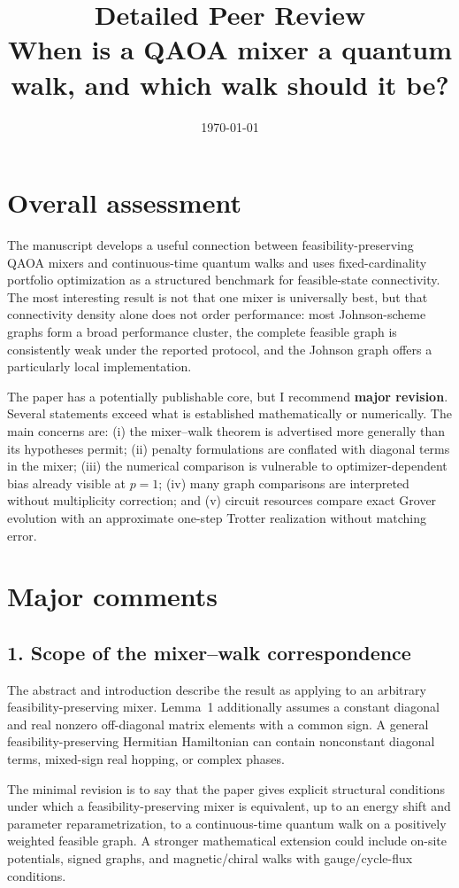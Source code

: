 \documentclass[11pt]{article}
\title{Detailed Peer Review\\\large When is a QAOA mixer a quantum walk, and which walk should it be?}
\date{\today}
\begin{document}
\maketitle
\section*{Overall assessment}
The manuscript develops a useful connection between feasibility-preserving QAOA mixers and continuous-time quantum walks and uses fixed-cardinality portfolio optimization as a structured benchmark for feasible-state connectivity. The most interesting result is not that one mixer is universally best, but that connectivity density alone does not order performance: most Johnson-scheme graphs form a broad performance cluster, the complete feasible graph is consistently weak under the reported protocol, and the Johnson graph offers a particularly local implementation.

The paper has a potentially publishable core, but I recommend \textbf{major revision}. Several statements exceed what is established mathematically or numerically. The main concerns are: (i) the mixer--walk theorem is advertised more generally than its hypotheses permit; (ii) penalty formulations are conflated with diagonal terms in the mixer; (iii) the numerical comparison is vulnerable to optimizer-dependent bias already visible at $p=1$; (iv) many graph comparisons are interpreted without multiplicity correction; and (v) circuit resources compare exact Grover evolution with an approximate one-step Trotter realization without matching error.

\section*{Major comments}
\subsection*{1. Scope of the mixer--walk correspondence}
The abstract and introduction describe the result as applying to an arbitrary feasibility-preserving mixer. Lemma~1 additionally assumes a constant diagonal and real nonzero off-diagonal matrix elements with a common sign. A general feasibility-preserving Hermitian Hamiltonian can contain nonconstant diagonal terms, mixed-sign real hopping, or complex phases.

The minimal revision is to say that the paper gives explicit structural conditions under which a feasibility-preserving mixer is equivalent, up to an energy shift and parameter reparametrization, to a continuous-time quantum walk on a positively weighted feasible graph. A stronger mathematical extension could include on-site potentials, signed graphs, and magnetic/chiral walks with gauge/cycle-flux conditions.
\end{document}
